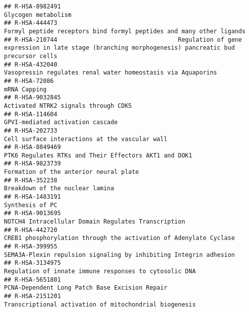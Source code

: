 \documentclass[
]{article}
\begin{document}
\begin{verbatim}
## R-HSA-8982491                                                                                                                  Glycogen metabolism
## R-HSA-444473                                                                  Formyl peptide receptors bind formyl peptides and many other ligands
## R-HSA-210744                                  Regulation of gene expression in late stage (branching morphogenesis) pancreatic bud precursor cells
## R-HSA-432040                                                                          Vasopressin regulates renal water homeostasis via Aquaporins
## R-HSA-72086                                                                                                                           mRNA Capping
## R-HSA-9032845                                                                                                 Activated NTRK2 signals through CDK5
## R-HSA-114604                                                                                                      GPVI-mediated activation cascade
## R-HSA-202733                                                                                        Cell surface interactions at the vascular wall
## R-HSA-8849469                                                                                PTK6 Regulates RTKs and Their Effectors AKT1 and DOK1
## R-HSA-9823739                                                                                               Formation of the anterior neural plate
## R-HSA-352238                                                                                                       Breakdown of the nuclear lamina
## R-HSA-1483191                                                                                                                      Synthesis of PC
## R-HSA-9013695                                                                                  NOTCH4 Intracellular Domain Regulates Transcription
## R-HSA-442720                                                                     CREB1 phosphorylation through the activation of Adenylate Cyclase
## R-HSA-399955                                                                     SEMA3A-Plexin repulsion signaling by inhibiting Integrin adhesion
## R-HSA-3134975                                                                               Regulation of innate immune responses to cytosolic DNA
## R-HSA-5651801                                                                                       PCNA-Dependent Long Patch Base Excision Repair
## R-HSA-2151201                                                                               Transcriptional activation of mitochondrial biogenesis

\end{verbatim}
\end{document}
